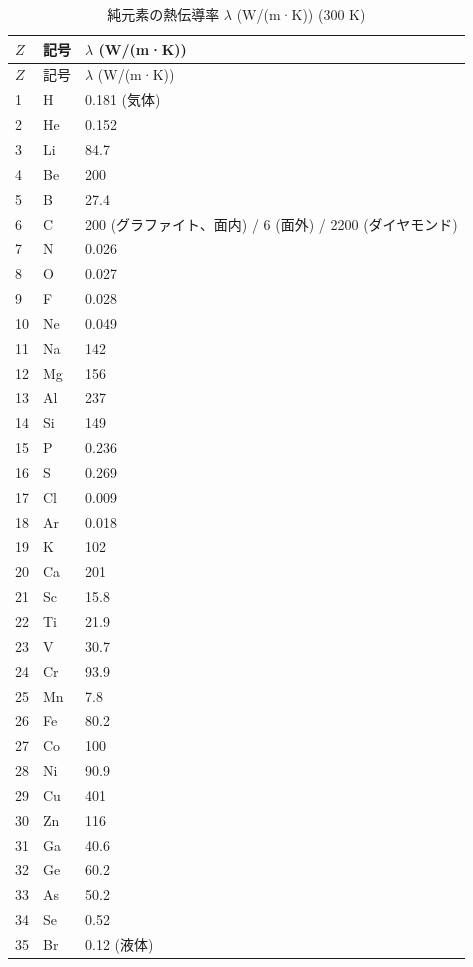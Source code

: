 \documentclass[11pt,a4paper]{article}
\theoremstyle{remark}
\begin{document}
	\begin{longtable}{p{0.6cm}p{1.2cm}p{1.5cm}}
		\caption{純元素の熱伝導率 \(\lambda\) (W/(m·K)) (300 K)} \label{tab:thermal-conductivity-all} \\
		\toprule
		\(Z\) & 記号 & \(\lambda\) (W/(m·K)) \\
		\midrule
		\endfirsthead
		\toprule
		\(Z\) & 記号 & \(\lambda\) (W/(m·K)) \\
		\midrule
		\endhead
		1  & H  & 0.181 (気体) \\
		2  & He & 0.152 \\
		3  & Li & 84.7 \\
		4  & Be & 200 \\
		5  & B  & 27.4 \\
		6  & C  & 200 (グラファイト、面内) / 6 (面外) / 2200 (ダイヤモンド) \\
		7  & N  & 0.026 \\
		8  & O  & 0.027 \\
		9  & F  & 0.028 \\
		10 & Ne & 0.049 \\
		11 & Na & 142 \\
		12 & Mg & 156 \\
		13 & Al & 237 \\
		14 & Si & 149 \\
		15 & P  & 0.236 \\
		16 & S  & 0.269 \\
		17 & Cl & 0.009 \\
		18 & Ar & 0.018 \\
		19 & K  & 102 \\
		20 & Ca & 201 \\
		21 & Sc & 15.8 \\
		22 & Ti & 21.9 \\
		23 & V  & 30.7 \\
		24 & Cr & 93.9 \\
		25 & Mn & 7.8 \\
		26 & Fe & 80.2 \\
		27 & Co & 100 \\
		28 & Ni & 90.9 \\
		29 & Cu & 401 \\
		30 & Zn & 116 \\
		31 & Ga & 40.6 \\
		32 & Ge & 60.2 \\
		33 & As & 50.2 \\
		34 & Se & 0.52 \\
		35 & Br & 0.12 (液体) \\

\end{longtable}
\end{document}
